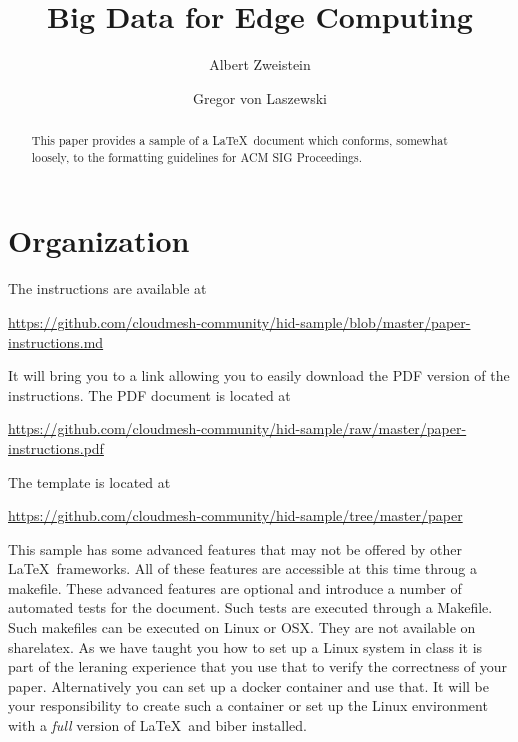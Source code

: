 
\title{Big Data for Edge Computing}


\author{Albert Zweistein}

\author{Gregor von Laszewski}


\renewcommand{\shortauthors}{G. v. Laszewski}


\begin{abstract}
This paper provides a sample of a \LaTeX\ document which conforms,
somewhat loosely, to the formatting guidelines for
ACM SIG Proceedings.
\end{abstract}



\maketitle

\section{Organization}

The instructions are available at 

\url{https://github.com/cloudmesh-community/hid-sample/blob/master/paper-instructions.md}

It will bring you to a link allowing you to easily download the PDF
version of the instructions. The PDF document is located at 

\url{https://github.com/cloudmesh-community/hid-sample/raw/master/paper-instructions.pdf}


The template is located at

\url{https://github.com/cloudmesh-community/hid-sample/tree/master/paper}


This sample has some advanced features that may not be offered by
other \LaTeX\ frameworks. All of these features are accessible at this
time throug a makefile. These advanced features are optional and
introduce a number of automated tests for the document. Such tests are
executed through a Makefile. Such makefiles can be executed on Linux
or OSX. They are not available on sharelatex. As we have taught you
how to set up a Linux system in class it is part of the leraning
experience that you use that to verify the correctness of your
paper. Alternatively you can set up a docker container and use
that. It will be your responsibility to create such a container or set
up the Linux environment with a \textit{full} version of \LaTeX\ and biber
installed.


